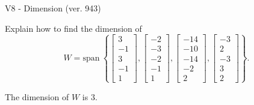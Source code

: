 \begin{exercise}
  \begin{exerciseTitle}V8 - Dimension (ver. 943)\end{exerciseTitle}
  \begin{exerciseStatement}
    Explain how to find the dimension of 
\[W=\mathrm{span}\ \left\{\left[\begin{array}{r}
3 \\
-1 \\
3 \\
-1 \\
1
\end{array}\right] , \left[\begin{array}{r}
-2 \\
-3 \\
-2 \\
-1 \\
1
\end{array}\right] , \left[\begin{array}{r}
-14 \\
-10 \\
-14 \\
-2 \\
2
\end{array}\right] , \left[\begin{array}{r}
-3 \\
2 \\
-3 \\
3 \\
2
\end{array}\right]\right\}.\]



  \end{exerciseStatement}
  \begin{exerciseAnswer}
   The dimension of \(W\) is  \(3\).
  


  \end{exerciseAnswer}
\end{exercise}
